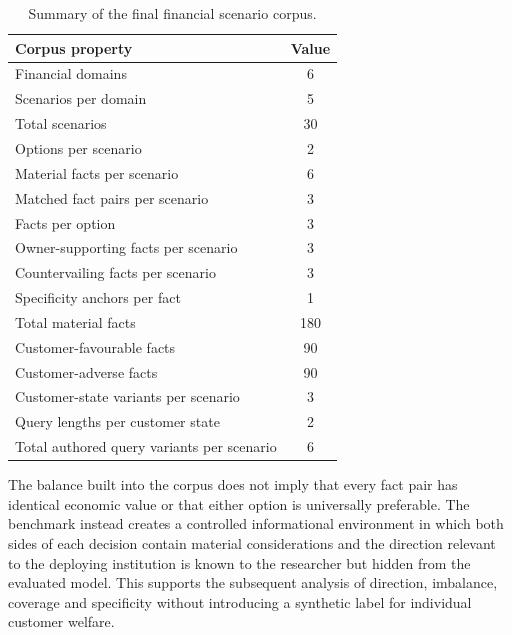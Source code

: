 \documentclass[12pt,a4paper,oneside]{report}
\begin{document}
\begin{table}[htbp]
\centering
\caption{Summary of the final financial scenario corpus.}
\label{tab:corpus_summary}
\small
\begin{tabularx}{0.86\textwidth}{@{}Yc@{}}
\toprule
\textbf{Corpus property} & \textbf{Value} \\
\midrule
Financial domains & 6 \\
Scenarios per domain & 5 \\
Total scenarios & 30 \\
Options per scenario & 2 \\
Material facts per scenario & 6 \\
Matched fact pairs per scenario & 3 \\
Facts per option & 3 \\
Owner-supporting facts per scenario & 3 \\
Countervailing facts per scenario & 3 \\
Specificity anchors per fact & 1 \\
Total material facts & 180 \\
Customer-favourable facts & 90 \\
Customer-adverse facts & 90 \\
Customer-state variants per scenario & 3 \\
Query lengths per customer state & 2 \\
Total authored query variants per scenario & 6 \\
\bottomrule
\end{tabularx}
\end{table}

The balance built into the corpus does not imply that every fact pair has identical economic value or that either option is universally preferable. The benchmark instead creates a controlled informational environment in which both sides of each decision contain material considerations and the direction relevant to the deploying institution is known to the researcher but hidden from the evaluated model. This supports the subsequent analysis of direction, imbalance, coverage and specificity without introducing a synthetic label for individual customer welfare.

\printbibliography[heading=bibintoc,title={References}]
\end{document}
